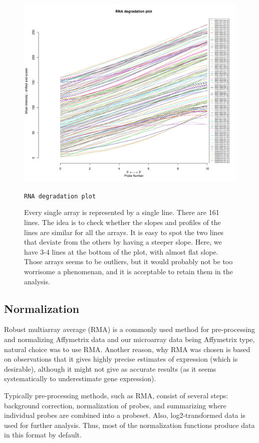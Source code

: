 \documentclass[oneside, a4paper, 11pt]{book}
\begin{document}
\begin{figure}[h]
    \centering
    \includegraphics[scale=0.45]{rnadeg.png}
    \caption{\texttt{RNA degradation plot}}
    \captionsetup{singlelinecheck=off, font=footnotesize, width=\textwidth}
    \caption*{Every single array is represented by a single line. There are 161 lines. The idea is to check whether the slopes and profiles of the lines are similar for all the arrays. It is easy to spot the two lines that deviate from the others by having a steeper slope. Here, we have 3-4 lines at the bottom of the plot, with almost flat slope. Those arrays seems to be outliers, but it would probably not be too worrisome a phenomenan, and it is acceptable to retain them in the analysis.}
\end{figure}

\subsection{Normalization}
Robust multiarray average (RMA) is a commonly used method for pre-processing and normalizing Affymetrix data and our microarray data being Affymetrix type, natural choice was to use RMA. Another reason, why RMA was chosen is based on observations that it gives highly precise estimates of expression (which is desirable), although it might not give as accurate results (as it seems systematically to underestimate gene expression).

Typically pre-processing methods, such as RMA, consist of several steps: background correction, normalization of probes, and summarizing where individual probes are combined into a probeset. Also, log2-transformed data is used for further analysis. Thus, most of the normalization functions produce data in this format by default.
\end{document}
